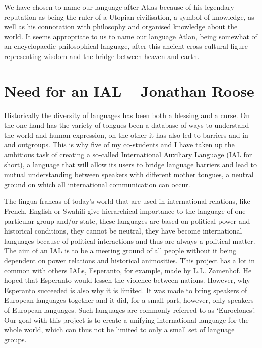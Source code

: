 We have chosen to name our language after Atlas because of his legendary reputation as being the ruler of a Utopian civilisation, a symbol of knowledge, as well as his connotation with philosophy and organised knowledge about the world. It seems appropriate to us to name our language Atlan, being somewhat of an encyclopaedic philosophical language, after this ancient cross-cultural figure representing wisdom and the bridge between heaven \nopagebreak and earth. 


\section{Need for an IAL -- {\small Jonathan Roose}}
Historically the diversity of languages has been both a blessing and a curse. On the one hand has the variety of tongues been a database of ways to understand the world and human expression, on the other it has also led to barriers and in- and outgroups. This is why five of my co-students and I have taken up the ambitious task of creating a so-called International Auxiliary Language (IAL for short), a language that will allow its users to bridge language barriers and lead to mutual understanding between speakers with different mother tongues, a neutral ground  on which all international communication can occur. 

The lingua francas of today's world that are used in international relations, like French, English or Swahili give hierarchical importance to the language of one particular group and/or state, these languages are based on political power and historical conditions, they cannot be neutral, they have become international languages because of political interactions and thus are always a political matter. The aim of an IAL is to be a meeting ground  of all people without it being dependent on power relations and historical animosities. This project has a lot in common with others IALs, Esperanto, for example, made by L.L. Zamenhof. He hoped that Esperanto would lessen the violence between nations. However, why Esperanto succeeded is also why it is limited. It was made to bring speakers of European languages together and it did, for a small part, however, only speakers of European languages. Such languages are commonly referred to as ‘Euroclones’. Our goal with this project is to create a unifying international language for the whole world, which can thus not be limited to only a small set of language groups. 

